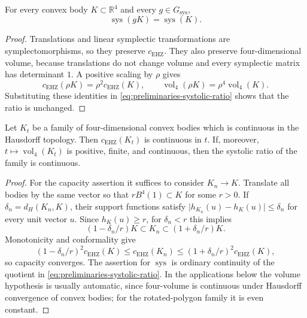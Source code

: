 \begin{lemma}
\label{lem:preliminaries-systolic-ratio-invariance}
For every convex body \(K\subset\mathbb R^4\) and every
\(g\in G_{\operatorname{sys}}\),
\[
  \operatorname{sys}(gK)=\operatorname{sys}(K).
\]
\end{lemma}

\begin{proof}
Translations and linear symplectic transformations are symplectomorphisms, so
they preserve \(c_{\mathrm{EHZ}}\). They also preserve four-dimensional
volume, because translations do not change volume and every symplectic matrix
has determinant \(1\). A positive scaling by \(\rho\) gives
\[
  c_{\mathrm{EHZ}}(\rho K)=\rho^2c_{\mathrm{EHZ}}(K),
  \qquad
  \operatorname{vol}_4(\rho K)=\rho^4\operatorname{vol}_4(K).
\]
Substituting these identities in
\eqref{eq:preliminaries-systolic-ratio} shows that the ratio is unchanged.
\end{proof}

\begin{proposition}[Continuity]\label{prop:preliminaries-sys-hausdorff-continuity}
Let \(K_t\) be a family of four-dimensional convex bodies which is continuous
in the Hausdorff topology. Then \(c_{\mathrm{EHZ}}(K_t)\) is continuous in
\(t\). If, moreover, \(t\mapsto\operatorname{vol}_4(K_t)\) is positive,
finite, and continuous, then the systolic ratio of the family is continuous.
\end{proposition}

\begin{proof}
For the capacity assertion it suffices to consider \(K_n\to K\). Translate
all bodies by the same vector so that \(rB^4(1)\subset K\) for some
\(r>0\). If \(\delta_n=d_H(K_n,K)\), their support functions satisfy
\(\lvert h_{K_n}(u)-h_K(u)\rvert\leq\delta_n\) for every unit vector
\(u\). Since \(h_K(u)\geq r\), for \(\delta_n<r\) this implies
\[
 (1-\delta_n/r)K\subset K_n\subset(1+\delta_n/r)K.
\]
Monotonicity and conformality give
\[
 (1-\delta_n/r)^2c_{\mathrm{EHZ}}(K)
 \leq c_{\mathrm{EHZ}}(K_n)
 \leq(1+\delta_n/r)^2c_{\mathrm{EHZ}}(K),
\]
so capacity converges. The assertion for \(\operatorname{sys}\) is
ordinary continuity of the quotient in
\eqref{eq:preliminaries-systolic-ratio}. In the applications below the volume
hypothesis is usually automatic, since four-volume is continuous under
Hausdorff convergence of convex bodies; for the rotated-polygon family it is
even constant.
\end{proof}
